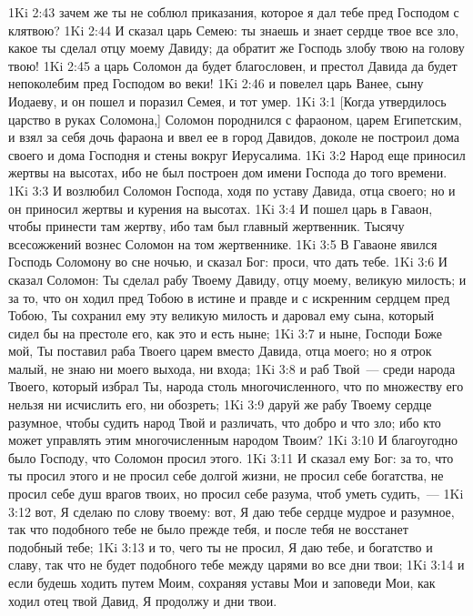 \vs 1Ki 2:43 зачем же ты не соблюл приказания, которое я дал тебе пред Господом с клятвою?
\vs 1Ki 2:44 И сказал царь Семею: ты знаешь и знает сердце твое все зло, какое ты сделал отцу моему Давиду; да обратит же Господь злобу твою на голову твою!
\vs 1Ki 2:45 а царь Соломон да будет благословен, и престол Давида да будет непоколебим пред Господом во веки!
\vs 1Ki 2:46 и повелел царь Ванее, сыну Иодаеву, и он пошел и поразил Семея, и тот умер.
\vs 1Ki 3:1 [Когда утвердилось царство в руках Соломона,] Соломон породнился с фараоном, царем Египетским, и взял за себя дочь фараона и ввел ее в город Давидов, доколе не построил дома своего и дома Господня и стены вокруг Иерусалима.
\vs 1Ki 3:2 Народ еще приносил жертвы на высотах, ибо не был построен дом имени Господа до того времени.
\vs 1Ki 3:3 И возлюбил Соломон Господа, ходя по уставу Давида, отца своего; но и он приносил жертвы и курения на высотах.
\vs 1Ki 3:4 И пошел царь в Гаваон, чтобы принести там жертву, ибо там был главный жертвенник. Тысячу всесожжений вознес Соломон на том жертвеннике.
\rsbpar\vs 1Ki 3:5 В Гаваоне явился Господь Соломону во сне ночью, и сказал Бог: проси, что дать тебе.
\vs 1Ki 3:6 И сказал Соломон: Ты сделал рабу Твоему Давиду, отцу моему, великую милость; и за то, что он ходил пред Тобою в истине и правде и с искренним сердцем пред Тобою, Ты сохранил ему эту великую милость и даровал ему сына, который сидел бы на престоле его, как это и есть ныне;
\vs 1Ki 3:7 и ныне, Господи Боже мой, Ты поставил раба Твоего царем вместо Давида, отца моего; но я отрок малый, не знаю ни моего выхода, ни входа;
\vs 1Ki 3:8 и раб Твой~--- среди народа Твоего, который избрал Ты, народа столь многочисленного, что по множеству его нельзя ни исчислить его, ни обозреть;
\vs 1Ki 3:9 даруй же рабу Твоему сердце разумное, чтобы судить народ Твой и различать, что добро и что зло; ибо кто может управлять этим многочисленным народом Твоим?
\vs 1Ki 3:10 И благоугодно было Господу, что Соломон просил этого.
\vs 1Ki 3:11 И сказал ему Бог: за то, что ты просил этого и не просил себе долгой жизни, не просил себе богатства, не просил себе душ врагов твоих, но просил себе разума, чтоб уметь судить,~---
\vs 1Ki 3:12 вот, Я сделаю по слову твоему: вот, Я даю тебе сердце мудрое и разумное, так что подобного тебе не было прежде тебя, и после тебя не восстанет подобный тебе;
\vs 1Ki 3:13 и то, чего ты не просил, Я даю тебе, и богатство и славу, так что не будет подобного тебе между царями во все дни твои;
\vs 1Ki 3:14 и если будешь ходить путем Моим, сохраняя уставы Мои и заповеди Мои, как ходил отец твой Давид, Я продолжу и дни твои.
